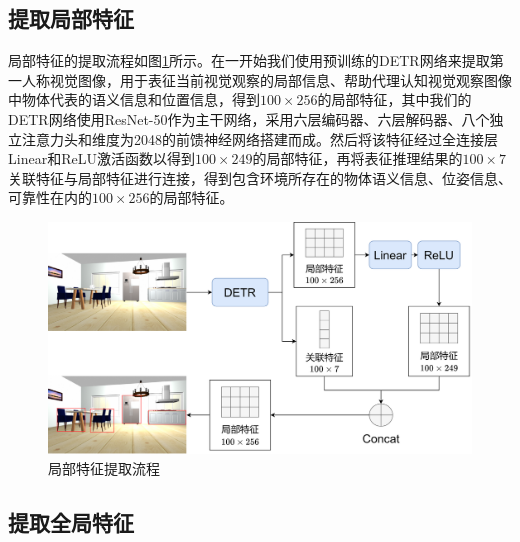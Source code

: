\subsection{提取局部特征}
局部特征的提取流程如图\ref{局部特征提取}所示。在一开始我们使用预训练的DETR网络来提取第一人称视觉图像，用于表征当前视觉观察的局部信息、帮助代理认知视觉观察图像中物体代表的语义信息和位置信息，得到$100 \times 256$的局部特征，其中我们的DETR网络使用ResNet-50作为主干网络，采用六层编码器、六层解码器、八个独立注意力头和维度为2048的前馈神经网络搭建而成。然后将该特征经过全连接层Linear和ReLU激活函数以得到$100 \times 249$的局部特征，再将表征推理结果的$100 \times 7$关联特征与局部特征进行连接，得到包含环境所存在的物体语义信息、位姿信息、可靠性在内的$100 \times 256$的局部特征。
\begin{figure}[htbp]
    \centering
    \includegraphics[scale=0.09]{Fig/局部特征提取.png}
    \caption{\label{局部特征提取}局部特征提取流程}
\end{figure}

\subsection{提取全局特征}


